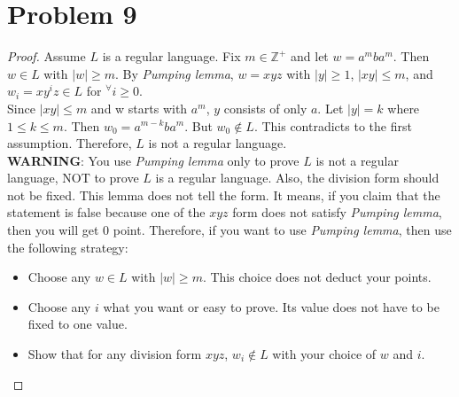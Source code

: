 \section*{Problem 9}
	\begin{proof}
		Assume $L$ is a regular language. Fix $m\in\mathbb{Z}^+$ and let $w=a^mba^m$. Then $w\in L$ with $|w|\geq m$. By \textit{Pumping lemma}, $w=xyz$ with $|y|\geq 1$, $|xy|\leq m$, and $w_i=xy^iz\in L$ for $^\forall i\geq0$.\\
		Since $|xy|\leq m$ and w starts with $a^m$, $y$ consists of only $a$. Let $|y|=k$ where $1\leq k\leq m$. Then $w_0 = a^{m-k}ba^m$. But $w_0\not\in L$. This contradicts to the first assumption. Therefore, $L$ is not a regular language.\\
		{\color{orange} \textbf{WARNING}}: You use \textit{Pumping lemma} only to prove $L$ is not a regular language, {\color{red}NOT to prove} $L$ is a regular language. Also, {\color{red}the division form should not be fixed}. This lemma does not tell the form. It means, if you claim that the statement is false because one of the $xyz$ form does not satisfy \textit{Pumping lemma}, then you will get 0 point. Therefore, if you want to use \textit{Pumping lemma}, then use the following strategy:
		\begin{itemize}
			\item Choose any $w\in L$ with $|w| \geq m$. This choice does not deduct your points.
			\item Choose any $i$ what you want or easy to prove. Its value does not have to be fixed to one value.
			\item Show that for any division form $xyz$, $w_i\not\in L$ with your choice of $w$ and $i$.
		\end{itemize}
	\end{proof}